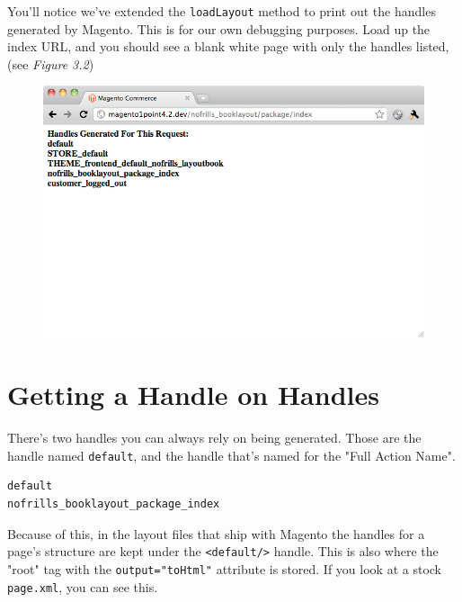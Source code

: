 \documentclass[oneside]{book}
\begin{document}
You'll notice we've extended the \footnotesize\texttt{loadLayout} \normalsize  method to print out the handles generated by Magento.  This is for our own debugging purposes.  Load up the index URL, and you should see a blank white page with only the handles listed, (see \emph{Figure 3.2})

\begin{figure}[htb]
\begin{center}
\leavevmode
\includegraphics[width=1\textwidth]{images/chapter3/blank-with-handles.png}
\end{center}
\caption{}
\end{figure}


\section{Getting a Handle on Handles}

There's two handles you can always rely on being generated.  Those are the handle named \footnotesize\texttt{default}\normalsize, and the handle that's named for the "Full Action Name".

\begin{lstlisting}
default
nofrills_booklayout_package_index

\end{lstlisting}


Because of this, in the layout files that ship with Magento the handles for a page's structure are kept under the \footnotesize\texttt{\textless default/\textgreater } \normalsize  handle.  This is also where the "root" tag with the \footnotesize\texttt{output="toHtml"} \normalsize  attribute is stored. If you look at a stock \footnotesize\texttt{page.xml}\normalsize, you can see this.
\end{document}
